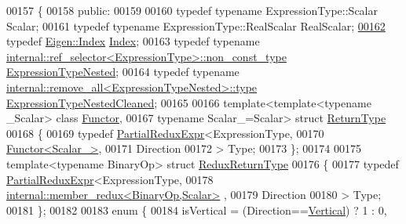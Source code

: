 \begin{DoxyCode}
00157 \{
00158   \textcolor{keyword}{public}:
00159 
00160     \textcolor{keyword}{typedef} \textcolor{keyword}{typename} ExpressionType::Scalar Scalar;
00161     \textcolor{keyword}{typedef} \textcolor{keyword}{typename} ExpressionType::RealScalar RealScalar;
\hyperlink{group___core___module_a4907c654e5810edd98e4162093b19532}{00162}     \textcolor{keyword}{typedef} \hyperlink{namespace_eigen_a62e77e0933482dafde8fe197d9a2cfde}{Eigen::Index} \hyperlink{group___core___module_a4907c654e5810edd98e4162093b19532}{Index}; 
00163     \textcolor{keyword}{typedef} \textcolor{keyword}{typename} \hyperlink{class_eigen_1_1internal_1_1_tensor_lazy_evaluator_writable}{internal::ref\_selector<ExpressionType>::non\_const\_type}
       \hyperlink{class_eigen_1_1internal_1_1_tensor_lazy_evaluator_writable}{ExpressionTypeNested};
00164     \textcolor{keyword}{typedef} \textcolor{keyword}{typename} \hyperlink{group___sparse_core___module}{internal::remove\_all<ExpressionTypeNested>::type}
       \hyperlink{group___sparse_core___module}{ExpressionTypeNestedCleaned};
00165 
00166     \textcolor{keyword}{template}<\textcolor{keyword}{template}<\textcolor{keyword}{typename} \_Scalar> \textcolor{keyword}{class }\hyperlink{struct_functor}{Functor},
00167                       \textcolor{keyword}{typename} Scalar\_=Scalar> \textcolor{keyword}{struct }\hyperlink{struct_eigen_1_1_vectorwise_op_1_1_return_type}{ReturnType}
00168     \{
00169       \textcolor{keyword}{typedef} \hyperlink{group___core___module_class_eigen_1_1_partial_redux_expr}{PartialReduxExpr}<ExpressionType,
00170                                \hyperlink{struct_functor}{Functor<Scalar\_>},
00171                                Direction
00172                               > Type;
00173     \};
00174 
00175     \textcolor{keyword}{template}<\textcolor{keyword}{typename} BinaryOp> \textcolor{keyword}{struct }\hyperlink{struct_eigen_1_1_vectorwise_op_1_1_redux_return_type}{ReduxReturnType}
00176     \{
00177       \textcolor{keyword}{typedef} \hyperlink{group___core___module_class_eigen_1_1_partial_redux_expr}{PartialReduxExpr}<ExpressionType,
00178                                \hyperlink{struct_eigen_1_1internal_1_1member__redux}{internal::member\_redux<BinaryOp,Scalar>}
      ,
00179                                Direction
00180                               > Type;
00181     \};
00182 
00183     \textcolor{keyword}{enum} \{
00184       isVertical   = (Direction==\hyperlink{group__enums_ggad49a7b3738e273eb00932271b36127f7addca718e0564723df21d61b94b1198be}{Vertical}) ? 1 : 0,

\end{DoxyCode}
